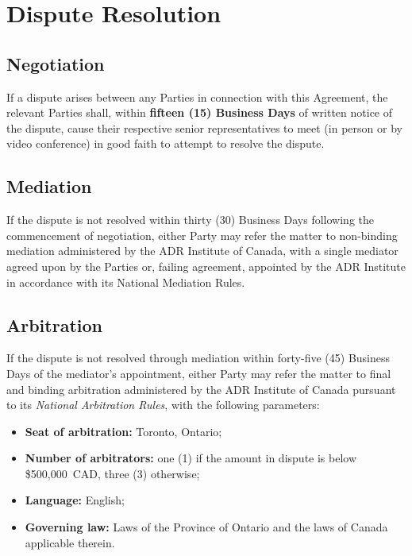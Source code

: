 \section{Dispute Resolution}
\label{sec:disputes}

\subsection{Negotiation}

If a dispute arises between any Parties in connection with this Agreement, the
relevant Parties shall, within \textbf{fifteen (15) Business Days} of written
notice of the dispute, cause their respective senior representatives to meet
(in person or by video conference) in good faith to attempt to resolve the
dispute.

\subsection{Mediation}

If the dispute is not resolved within thirty (30) Business Days following the
commencement of negotiation, either Party may refer the matter to non-binding
mediation administered by the ADR Institute of Canada, with a single mediator
agreed upon by the Parties or, failing agreement, appointed by the ADR Institute
in accordance with its National Mediation Rules.

\subsection{Arbitration}

If the dispute is not resolved through mediation within forty-five (45) Business
Days of the mediator's appointment, either Party may refer the matter to final
and binding arbitration administered by the ADR Institute of Canada pursuant to
its \textit{National Arbitration Rules}, with the following parameters:

\begin{itemize}[itemsep=3pt]
  \item \textbf{Seat of arbitration:} Toronto, Ontario;
  \item \textbf{Number of arbitrators:} one (1) if the amount in dispute is below
        \$500{,}000~CAD, three (3) otherwise;
  \item \textbf{Language:} English;
  \item \textbf{Governing law:} Laws of the Province of Ontario and the laws
        of Canada applicable therein.
\end{itemize}

